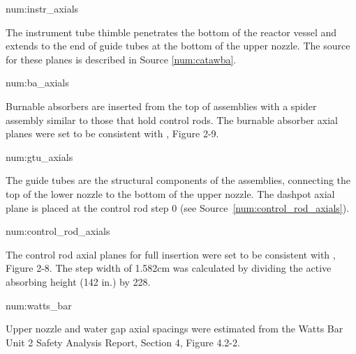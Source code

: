 \begin{numitem}{num:instr_axials}
  
  The instrument tube thimble penetrates the bottom of the reactor vessel and
  extends to the end of guide tubes at the bottom of the upper nozzle. The
  source for these planes is described in Source \ref{num:catawba}.
  
\end{numitem}

\begin{numitem}{num:ba_axials}
  
  Burnable absorbers are inserted from the top of assemblies with a spider
  assembly similar to those that hold control rods. The burnable absorber axial
  planes were set to be consistent with \cite{ml033530020}, Figure 2-9.
  
  
\end{numitem}

\begin{numitem}{num:gtu_axials}
  
  The guide tubes are the structural components of the assemblies, connecting
  the top of the lower nozzle to the bottom of the upper nozzle. The dashpot
  axial plane is placed at the control rod step 0 (see
  Source~\ref{num:control_rod_axials}).
  
\end{numitem}

\begin{numitem}{num:control_rod_axials}
  
  The control rod axial planes for full insertion were set to be consistent with
  \cite{ml033530020}, Figure 2-8. The step width of 1.582cm was calculated by
  dividing the active absorbing height (142 in.) by 228.
  
\end{numitem}

\begin{numitem}{num:watts_bar}

  Upper nozzle and water gap axial spacings were estimated from the Watts
  Bar Unit 2 Safety Analysis Report, Section 4, Figure 4.2-2.

\end{numitem}

